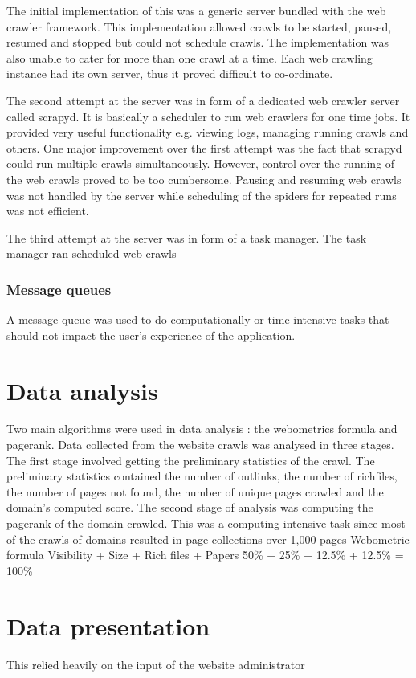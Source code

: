 \noindent
The initial implementation of this was a generic server bundled with the web crawler framework. This implementation allowed crawls to be started, paused, resumed and stopped but could not schedule crawls. The implementation was also unable to cater for more than one crawl at a time. Each web crawling instance had its own server, thus it proved difficult to co-ordinate.

\noindent
The second attempt at the server was in form of a dedicated web crawler server called scrapyd. It is basically a scheduler to run web crawlers for one time jobs. It provided very useful functionality e.g. viewing logs, managing running crawls and others. One major improvement over the first attempt was the fact that scrapyd could run multiple crawls simultaneously. However, control over the running of the web crawls proved to be too cumbersome. Pausing and resuming web crawls was not handled by the server while scheduling of the spiders for repeated runs was not efficient.

\noindent
The third attempt at the server was in form of a task manager. The task manager ran scheduled web crawls 

\subsubsection{Message queues}
\noindent
A message queue was used to do computationally or time intensive tasks that should not impact the user's experience of the application.

\section{Data analysis}
Two main algorithms were used in data analysis : the webometrics formula and pagerank.
Data collected from the website crawls was analysed in three stages. The first stage involved getting the preliminary statistics of the crawl. The preliminary statistics contained the number of outlinks, the number of richfiles, the number of pages not found, the number of unique pages crawled and the domain's computed score.
The second stage of analysis was computing the pagerank of the domain crawled. This was a computing intensive task since most of the crawls of domains resulted in page collections over 1,000 pages
Webometric formula
Visibility + Size + Rich files + Papers
50\% + 25\% + 12.5\% + 12.5\% = 100\%


\section{Data presentation}
This relied heavily on the input of the website administrator
